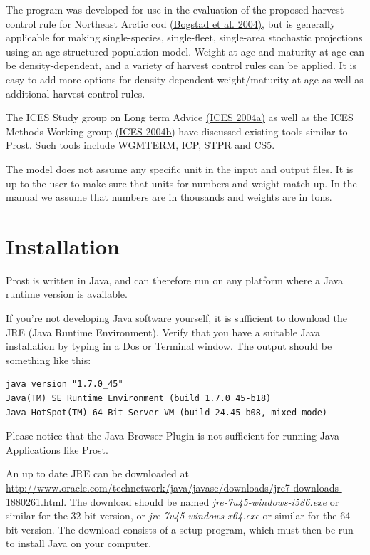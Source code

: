 \documentclass[12pt,twoside,a4paper]{article}
\begin{document}
The program was developed for use in the evaluation of the proposed
harvest control rule for Northeast Arctic cod
\hyperlink{bogstad}{(Bogstad et al. 2004)}, but is generally
applicable for making single-species, single-fleet, single-area
stochastic projections using an age-structured population
model. Weight at age and maturity at age can be density-dependent, and
a variety of harvest control rules can be applied. It is easy to add
more options for density-dependent weight/maturity at age as well as
additional harvest control rules.

The ICES Study group on Long term Advice \hyperlink{ices2004a}{(ICES 2004a)}
 as well as
the ICES Methods Working group \hyperlink{ices2004b}{(ICES 2004b)}
 have discussed existing tools
similar to Prost. Such tools include WGMTERM, ICP, STPR and CS5.


The model does not assume any specific unit in the input and output
files. It is up to the user to make sure that units for numbers and
weight match up. In the manual we assume that numbers are in thousands
and weights are in tons.

\section{Installation}
\label{install}
Prost is written in Java, and can therefore run on any platform where
a Java runtime version is available. 

If you're not developing Java software yourself, it is
sufficient to download the JRE (Java Runtime Environment).  Verify
that you have a suitable Java installation by
typing  in a Dos or Terminal window. The output
should be something like this: 
\begin{verbatim}
java version "1.7.0_45"
Java(TM) SE Runtime Environment (build 1.7.0_45-b18)
Java HotSpot(TM) 64-Bit Server VM (build 24.45-b08, mixed mode)
\end{verbatim}

Please notice that the Java Browser Plugin is not sufficient for running Java Applications like
Prost.

An up
to date JRE can be downloaded at
\url{http://www.oracle.com/technetwork/java/javase/downloads/jre7-downloads-1880261.html}. The
download should be named \emph{jre-7u45-windows-i586.exe} or similar for the 32 bit version,
or \emph{jre-7u45-windows-x64.exe} or similar for the 64 bit version. The download
consists of a setup program, which must then be run to install Java on
your computer.
\end{document}
